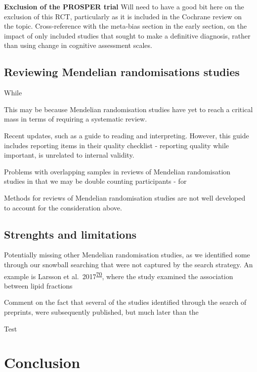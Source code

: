\documentclass[a4paper, twoside]{templates/ociamthesis}
\begin{document}
\textbf{Exclusion of the PROSPER trial} Will need to have a good bit here on the exclusion of this RCT, particularly as it is included in the Cochrane review on the topic. Cross-reference with the meta-bias section in the early section, on the impact of only included studies that sought to make a definitive diagnosis, rather than using change in cognitive assessment scales.

\hypertarget{reviewing-mendelian-randomisations-studies}{%
\subsection{Reviewing Mendelian randomisations studies}\label{reviewing-mendelian-randomisations-studies}}

While

This may be because Mendelian randomisation studies have yet to reach a critical mass in terms of requiring a systematic review.

Recent updates, such as a guide to reading and interpreting. However, this guide includes reporting items in their quality checklist - reporting quality while important, is unrelated to internal validity.

Problems with overlapping samples in reviews of Mendelian randomisation studies in that we may be double counting participants - for

Methods for reviews of Mendelian randomisation studies are not well developed to account for the consideration above.

\hypertarget{strenghts-and-limitations}{%
\subsection{Strenghts and limitations}\label{strenghts-and-limitations}}

Potentially missing other Mendelian randomisation studies, as we identified some through our snowball searching that were not captured by the search strategy. An example is Larsson et al.~2017\textsuperscript{\protect\hyperlink{ref-larsson2017a}{70}}, where the study examined the association between lipid fractions

Comment on the fact that several of the studies identified through the search of preprints, were subsequently published, but much later than the

Test

\hypertarget{conclusion}{%
\section{Conclusion}\label{conclusion}}
\end{document}
